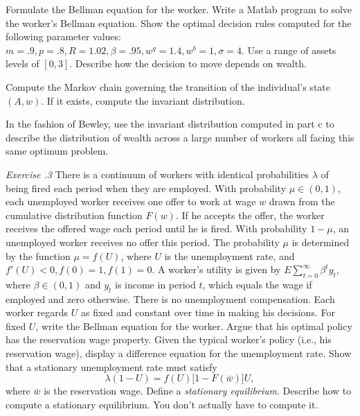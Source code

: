 \medskip
{} Formulate the Bellman equation for the worker.
\medskip
{}  Write a Matlab program to  solve the worker's
Bellman equation.  Show the optimal decision rules computed for
the following parameter values: $m=.9, p=.8, R=1.02,  \beta = .95,
w^g= 1.4, w^b =1, \sigma=4$.  Use a range of assets levels of
$[0, 3]$.  Describe how the decision to move depends on wealth.

\medskip
{}  Compute the Markov chain governing the transition
of the individual's state $(A,w)$.   If it exists, compute
the invariant distribution.

\medskip
{}  In the fashion of Bewley,
 use the invariant distribution  computed in part  c
to describe the distribution of wealth across  a large number of workers
all facing this same optimum problem.

\vfil\eject
\medskip\noindent
{\it Exercise \the\chapternum.3} 
\medskip\noindent
 There is a continuum of workers with identical
probabilities $\lambda$ of being fired each period
when they are employed. With probability $\mu \in (0,1)$,
each unemployed worker receives one offer to work
at wage $w$ drawn from the cumulative distribution
function $F(w)$. If he accepts the offer,
the worker receives the offered wage each
period until he is fired. With probability $1-\mu$, an unemployed
worker receives no offer this period. The probability
$\mu$ is determined by the function
$ \mu= f(U)$, where $U$ is the unemployment rate, and
$f'(U) < 0, f(0) =1, f(1)=0$. A worker's
utility is given by $E \sum_{t=0}^\infty \beta^t y_t$, where
$\beta \in (0,1)$ and $y_t$ is income in period $t$,
which equals the wage if employed and zero otherwise.
There is no unemployment compensation. Each worker
regards $U$ as fixed and constant over time in making his
decisions.
\medskip
{} For fixed $U$, write the Bellman equation
for the worker. Argue that his optimal policy
has the reservation wage property.
\medskip
{} Given the typical worker's
policy (i.e., his reservation wage),
 display a difference equation for the unemployment
rate. Show that a stationary unemployment rate
must satisfy
$$ \lambda (1-U) = f(U) \bigl[ 1-F(\bar w)\bigr] U , $$
where $\bar w$ is the reservation wage.
\medskip
{} Define a {\it stationary equilibrium}.
\medskip
{} Describe how to compute a stationary
equilibrium. You don't actually have to compute it.

\medskip

